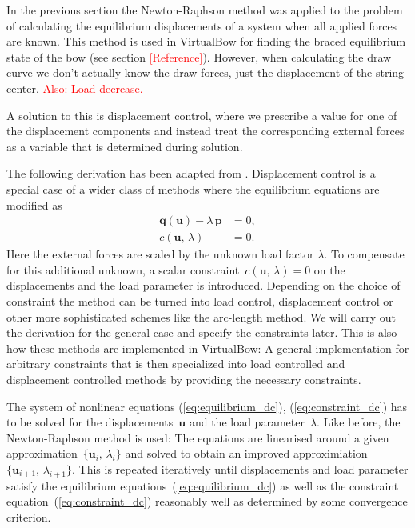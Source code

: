 In the previous section the Newton-Raphson method was applied to the problem of calculating the equilibrium displacements of a system when all applied forces are known. This method is used in VirtualBow for finding the braced equilibrium state of the bow (see section \textcolor{red}{[Reference]}). However, when calculating the draw curve we don't actually know the draw forces, just the displacement of the string center. \textcolor{red}{Also: Load decrease.}

A solution to this is displacement control, where we prescribe a value for one of the displacement components and instead treat the corresponding external forces as a variable that is determined during solution.

The following derivation has been adapted from \cite{fem_script_uni_bochum}. Displacement control is a special case of a wider class of methods where the equilibrium equations are modified as
%
\begin{align}
\boldsymbol{q}(\boldsymbol{u}) - \lambda\,\boldsymbol{p} &= 0,\label{eq:equilibrium_dc}\\
c(\boldsymbol{u},\,\lambda) &= 0.\label{eq:constraint_dc}
\end{align}
%
Here the external forces are scaled by the unknown load factor $\lambda$. To compensate for this additional unknown, a scalar constraint~$c(\boldsymbol{u},\,\lambda) = 0$ on the displacements and the load parameter is introduced. Depending on the choice of constraint the method can be turned into load control, displacement control or other more sophisticated schemes like the arc-length method. We will carry out the derivation for the general case and specify the constraints later. This is also how these methods are implemented in VirtualBow: A general implementation for arbitrary constraints that is then specialized into load controlled and displacement controlled methods by providing the necessary constraints.

The system of nonlinear equations (\ref{eq:equilibrium_dc}), (\ref{eq:constraint_dc}) has to be solved for the displacements~$\boldsymbol{u}$ and the load parameter~$\lambda$. Like before, the Newton-Raphson method is used: The equations are linearised around a given approximation~$\{\boldsymbol{u}_i,\,\lambda_i\}$ and solved to obtain an improved approximiation~$\{\boldsymbol{u}_{i+1},\,\lambda_{i+1}\}$. This is repeated iteratively until displacements and load parameter satisfy the equilibrium equations~(\ref{eq:equilibrium_dc}) as well as the constraint equation~(\ref{eq:constraint_dc}) reasonably well as determined by some convergence criterion.

